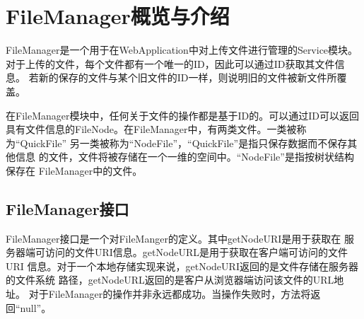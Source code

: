 
\section{FileManager概览与介绍}
FileManager是一个用于在WebApplication中对上传文件进行管理的Service模块。
对于上传的文件，每个文件都有一个唯一的ID，因此可以通过ID获取其文件信息。
若新的保存的文件与某个旧文件的ID一样，则说明旧的文件被新文件所覆盖。

在FileManager模块中，任何关于文件的操作都是基于ID的。可以通过ID可以返回
具有文件信息的FileNode。在FileManager中，有两类文件。一类被称为``QuickFile''
另一类被称为``NodeFile''，``QuickFile''是指只保存数据而不保存其他信息
的文件，文件将被存储在一个一维的空间中。``NodeFile''是指按树状结构保存在
FileManager中的文件。

\subsection{FileManager接口}
FileManager接口是一个对FileManger的定义。其中getNodeURI是用于获取在
服务器端可访问的文件URI信息。getNodeURL是用于获取在客户端可访问的文件URI
信息。对于一个本地存储实现来说，getNodeURI返回的是文件存储在服务器的文件系统
路径，getNodeURL返回的是客户从浏览器端访问该文件的URL地址。
对于FileManager的操作并非永远都成功。当操作失败时，方法将返回``null''。


